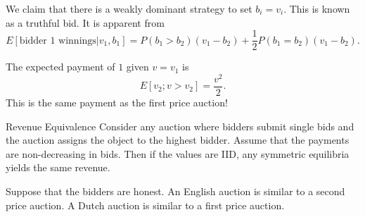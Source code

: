 We claim that there is a weakly dominant strategy to set $b_i=v_i$. This is known as a truthful bid. It is apparent from \[
E[\textrm{bidder 1 winnings}| v_1,b_1] =
P(b_1>b_2)(v_1-b_2) + \frac{1}{2}P(b_1=b_2) (v_1-b_2). 
\]

The expected payment of $1$ given $v=v_1$ is \[
E[v_2 ; v>v_2] =\frac{v^2}{2}.
\]
This is the same payment as the first price auction!

\begin{atheorem}{Revenue Equivalence}{}
    Consider any auction where bidders submit single bids and the auction assigns the object to the highest bidder. Assume that the payments are non-decreasing in bids.
    Then if the values are IID, any symmetric equilibria yields the same revenue. 
\end{atheorem}

Suppose that the bidders are honest. An English auction is similar to a second price auction. A Dutch auction is similar to a first price auction.